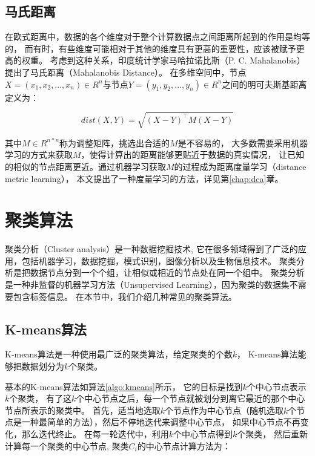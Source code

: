 \subsection{马氏距离}

在欧式距离中，数据的各个维度对于整个计算数据点之间距离所起到的作用是均等的，
而有时，有些维度可能相对于其他的维度具有更高的重要性，应该被赋予更高的权重。
考虑到这种关系，印度统计学家马哈拉诺比斯（P. C. Mahalanobis）提出了马氏距离（Mahalanobis Distance）。
在多维空间中，节点$X = (x_1, x_2, ..., x_n) \in R ^ n$与节点$Y = (y_1, y_2, ..., y_n) \in R ^ n$之间的明可夫斯基距离定义为：

\begin{equation}
    dist(X, Y) = \sqrt{(X - Y)^\top M (X - Y)}
\end{equation}

其中$M \in R ^{n * n}$称为调整矩阵，挑选出合适的$M$是不容易的，
大多数需要采用机器学习的方式来获取$M$，使得计算出的距离能够更贴近于数据的真实情况，
让已知的相似的节点距离更近。通过机器学习获取$M$的过程成为距离度量学习（distance metric learning），
本文提出了一种度量学习的方法，详见第\ref{chap:dca}章。

\section{聚类算法}
\label{sec:cluster}

聚类分析（Cluster analysis）是一种数据挖掘技术,
它在很多领域得到了广泛的应用，包括机器学习，数据挖掘，模式识别，图像分析以及生物信息技术。
聚类分析是把数据节点分到一个个组，让相似或相近的节点处在同一个组中。
聚类分析是一种非监督的机器学习方法（Unsupervised Learning），因为聚类的数据集不需要包含标签信息。
在本节中，我们介绍几种常见的聚类算法。

\subsection{K-means算法}

K-means算法是一种使用最广泛的聚类算法，给定聚类的个数$k$，
K-means算法能够把数据划分为$k$个聚类。

基本的K-means算法如算法\ref{algo:kmeans}所示，
它的目标是找到$k$个中心节点表示$k$个聚类，
有了这$k$个中心节点之后，每一个节点就被划分到离它最近的那个中心节点所表示的聚类中。
首先，适当地选取$k$个节点作为中心节点（随机选取$k$个节点是一种最简单的方法），然后不停地迭代来调整中心节点，
如果中心节点不再变化，那么迭代终止。
在每一轮迭代中，利用$k$个中心节点得到$k$个聚类，
然后重新计算每一个聚类的中心节点, 聚类$C_i$的中心节点计算方法为：

